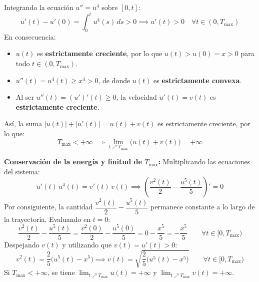 {    Integrando la ecuación $u'' = u^4$ sobre $[0, t]$:
    \[
        u'(t) - u'(0) = \int_0^t u^4(s)\, ds > 0 \implies u'(t) > 0 \quad \forall t \in (0, T_{\max})
    \]
    En consecuencia:
    \begin{itemize}
        \item $u(t)$ es \textbf{estrictamente creciente}, por lo que $u(t) > u(0) = x > 0$ para todo $t \in (0, T_{\max})$.
        \item $u''(t) = u^4(t) \geq x^4 > 0$, de donde $u(t)$ es \textbf{estrictamente convexa}.
        \item Al ser $u''(t) = (u')'(t) \geq 0$, la velocidad $u'(t) = v(t)$ es \textbf{estrictamente creciente}.
    \end{itemize}
    Así, la suma $|u(t)| + |u'(t)| = u(t) + v(t)$ es estrictamente creciente, por lo que:
    \[
        T_{\max} < +\infty \implies \lim_{t \nearrow T_{\max}} \bigl(u(t) + v(t)\bigr) = +\infty
    \]

    \begin{center}
    \end{center}

    \medskip

    \textbf{Conservación de la energía y finitud de $T_{\max}$:} Multiplicando las ecuaciones del sistema:
    \[
        u'(t)\, u^4(t) = v'(t)\, v(t) \implies \left( \frac{v^2(t)}{2} - \frac{u^5(t)}{5} \right)' = 0
    \]
    Por consiguiente, la cantidad $\dfrac{v^2(t)}{2} - \dfrac{u^5(t)}{5}$ permanece constante a lo largo de la trayectoria. Evaluando en $t = 0$:
    \[
        \frac{v^2(t)}{2} - \frac{u^5(t)}{5} = \frac{v^2(0)}{2} - \frac{u^5(0)}{5} = 0 - \frac{x^5}{5} = -\frac{x^5}{5} \qquad \forall t \in [0, T_{\max})
    \]
    Despejando $v(t)$ y utilizando que $v(t) = u'(t) > 0$:
    \[
        v^2(t) = \frac{2}{5}\bigl(u^5(t) - x^5\bigr) \implies v(t) = \sqrt{\frac{2}{5}\bigl(u^5(t) - x^5\bigr)} \qquad \forall t \in [0, T_{\max})
    \]
    Si $T_{\max} < +\infty$, se tiene $\displaystyle\lim_{t \nearrow T_{\max}} u(t) = +\infty$ y $\displaystyle\lim_{t \nearrow T_{\max}} v(t) = +\infty$.

}
